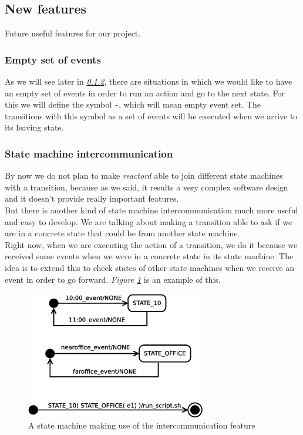 \subsection{New features}
Future useful features for our project.
\subsubsection{Empty set of events}
As we will see later in \emph{\ref{sec:smcom}}, there are situations in which we would like to have an empty set of events in order to run
an action and go to the next state. For this we will define the symbol \texttt{-}, which will mean empty event set. The transitions
with this symbol as a set of events will be executed when we arrive to its leaving state.
\subsubsection{State machine intercommunication}
\label{sec:smcom}
By now we do not plan to make \emph{reactord} able to join different state machines with a transition, because as we said, it results
a very complex software design and it doesn't provide really important features.\\
But there is another kind of state machine intercommunication much more useful and easy to develop. We are
talking about making a transition able to ask if we are in a concrete state that could be from another state machine.\\
Right now, when we are executing the action of a transition, we do it because we received some events when we were in a
concrete state in its state machine. The idea is to extend this to check states of other state machines when we receive an event in order 
to go forward. \emph{Figure \ref{fig:smcom}} is an example of this.
\begin{figure}[h]
  \centering
  \includegraphics[width=0.7\textwidth,keepaspectratio]{img/smcom}
  \caption{A state machine making use of the intercommunication feature}
  \label{fig:smcom}
\end{figure}
